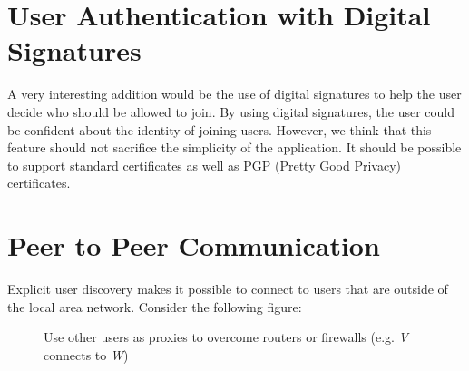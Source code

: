 \section{User Authentication with Digital Signatures}
A very interesting addition would be the use of digital signatures to help
the user decide who should be allowed to join. By using digital
signatures, the user could be confident about the identity of joining users.
However, we think that this feature should not sacrifice the simplicity
of the application. It should be possible to support standard certificates
as well as PGP (Pretty Good Privacy) certificates.


\section{Peer to Peer Communication}
Explicit user discovery makes it possible to connect to users that are outside 
of the local area network. Consider the following figure:

\begin{figure}[H]
 \centering
 \caption{Use other users as proxies to overcome routers or firewalls (e.g. \emph{V} connects to \emph{W})}
 \label{fig:network.protocol.requestcommunication}
\end{figure}

